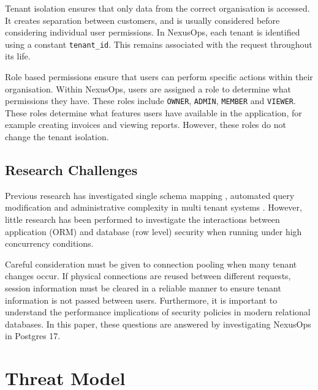 \documentclass[conference]{IEEEtran}
\begin{document}
Tenant isolation ensures that only data from the correct organisation is accessed. It creates separation between customers, and is usually considered before considering individual user permissions. In NexusOps, each tenant is identified using a constant \texttt{tenant\_id}. This remains associated with the request throughout its life.

Role based permissions ensure that users can perform specific actions within their organisation. Within NexusOps, users are assigned a role to determine what permissions they have. These roles include \texttt{OWNER}, \texttt{ADMIN}, \texttt{MEMBER} and \texttt{VIEWER}. These roles determine what features users have available in the application, for example creating invoices and viewing reports. However, these roles do not change the tenant isolation.

\subsection{Research Challenges}
Previous research has investigated single schema mapping \cite{aulbach2008}, automated query modification \cite{stonebraker1974} and administrative complexity in multi tenant systems \cite{bezemer2010, kabbedijk2015}. However, little research has been performed to investigate the interactions between application (ORM) and database (row level) security when running under high concurrency conditions.

Careful consideration must be given to connection pooling when many tenant changes occur. If physical connections are reused between different requests, session information must be cleared in a reliable manner to ensure tenant information is not passed between users. Furthermore, it is important to understand the performance implications of security policies in modern relational databases. In this paper, these questions are answered by investigating NexusOps in Postgres 17.

\section{Threat Model}
\label{sec:threat_model}
\end{document}
